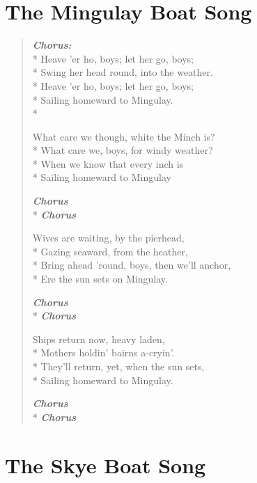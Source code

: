 \documentclass[9pt,twoside]{extarticle}
\makeatletter
\newenvironment{xverse}{
	\begin{verse}
	\fontsize{8.5}{10.5}\selectfont
}{
	\end{verse}
}
\newcommand{\chorusdef}{\textbf{\emph{Chorus:}}\\*}
\newcommand{\chorus@mark}[1][1]{%
\textbf{\emph{Chorus \ifthenelse{\equal{#1}{1}}{}{$\times$ #1}}}%
}
\newcommand{\chorusmark}[1][1]{%
\ifvmode%
\vspace{-0.5\stanzaskip}%
\chorus@mark[#1]%
\vspace{-0.5\stanzaskip}%
\else \\*%
\chorus@mark[#1]%
\fi%
}
\makeatother
\begin{document}
\section{The Mingulay Boat Song}

\begin{xverse}
\chorusdef
Heave ’er ho, boys; let her go, boys; \\*
Swing her head round, into the weather. \\*
Heave ’er ho, boys; let her go, boys; \\*
Sailing homeward to Mingulay. \\*

What care we though, white the Minch is? \\*
What care we, boys, for windy weather? \\*
When we know that every inch is \\*
Sailing homeward to Mingulay

\chorusmark

Wives are waiting, by the pierhead, \\*
Gazing seaward, from the heather, \\*
Bring ahead ’round, boys, then we’ll anchor, \\*
Ere the sun sets on Mingulay.

\chorusmark

Ships return now, heavy laden, \\*
Mothers holdin’ bairns a-cryin’. \\*
They’ll return, yet, when the sun sets, \\*
Sailing homeward to Mingulay.

\chorusmark[2]
\end{xverse}

\section{The Skye Boat Song}
\end{document}

